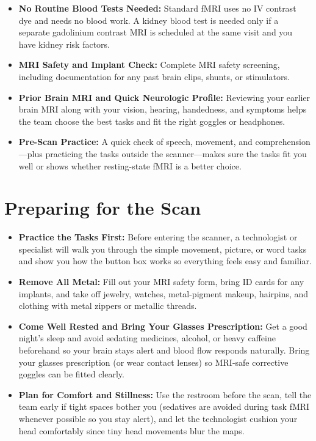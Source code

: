 \begin{itemize}
    \item \textbf{No Routine Blood Tests Needed:} Standard fMRI uses no IV contrast dye and needs no blood work. A kidney blood test is needed only if a separate gadolinium contrast MRI is scheduled at the same visit and you have kidney risk factors.
    \item \textbf{MRI Safety and Implant Check:} Complete MRI safety screening, including documentation for any past brain clips, shunts, or stimulators.
    \item \textbf{Prior Brain MRI and Quick Neurologic Profile:} Reviewing your earlier brain MRI along with your vision, hearing, handedness, and symptoms helps the team choose the best tasks and fit the right goggles or headphones.
    \item \textbf{Pre-Scan Practice:} A quick check of speech, movement, and comprehension---plus practicing the tasks outside the scanner---makes sure the tasks fit you well or shows whether resting-state fMRI is a better choice.
\end{itemize}

\section{Preparing for the Scan}

\begin{itemize}
    \item \textbf{Practice the Tasks First:} Before entering the scanner, a technologist or specialist will walk you through the simple movement, picture, or word tasks and show you how the button box works so everything feels easy and familiar.
    \item \textbf{Remove All Metal:} Fill out your MRI safety form, bring ID cards for any implants, and take off jewelry, watches, metal-pigment makeup, hairpins, and clothing with metal zippers or metallic threads.
    \item \textbf{Come Well Rested and Bring Your Glasses Prescription:} Get a good night's sleep and avoid sedating medicines, alcohol, or heavy caffeine beforehand so your brain stays alert and blood flow responds naturally. Bring your glasses prescription (or wear contact lenses) so MRI-safe corrective goggles can be fitted clearly.
    \item \textbf{Plan for Comfort and Stillness:} Use the restroom before the scan, tell the team early if tight spaces bother you (sedatives are avoided during task fMRI whenever possible so you stay alert), and let the technologist cushion your head comfortably since tiny head movements blur the maps.
\end{itemize}

